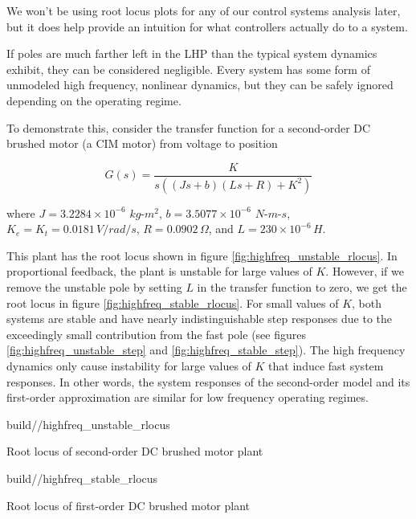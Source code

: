 We won't be using root locus plots for any of our control systems analysis
later, but it does help provide an intuition for what \glspl{controller}
actually do to a \gls{system}.

If poles are much farther left in the LHP than the typical \gls{system} dynamics
exhibit, they can be considered negligible. Every \gls{system} has some form of
unmodeled high frequency, nonlinear dynamics, but they can be safely ignored
depending on the operating regime.

To demonstrate this, consider the transfer function for a second-order DC
brushed motor (a CIM motor) from voltage to position

\begin{equation*}
  G(s) = \frac{K}{s((Js + b)(Ls + R) + K^2)}
\end{equation*}

where $J = 3.2284 \times 10^{-6}$ $kg$-$m^2$, $b = 3.5077 \times 10^{-6}$
$N$-$m$-$s$, $K_e = K_t = 0.0181 \,V/rad/s$, $R = 0.0902 \,\Omega$, and
$L = 230 \times 10^{-6} \,H$.

This \gls{plant} has the root locus shown in figure
\ref{fig:highfreq_unstable_rlocus}. In proportional feedback, the \gls{plant} is
unstable for large values of $K$. However, if we remove the unstable pole by
setting $L$ in the transfer function to zero, we get the root locus in figure
\ref{fig:highfreq_stable_rlocus}. For small values of $K$, both \glspl{system}
are stable and have nearly indistinguishable \glspl{step response} due to the
exceedingly small contribution from the fast pole (see figures
\ref{fig:highfreq_unstable_step} and \ref{fig:highfreq_stable_step}). The high
frequency dynamics only cause instability for large values of $K$ that induce
fast \glspl{system response}. In other words, the \glspl{system response} of the
second-order model and its first-order approximation are similar for low
frequency operating regimes.

\begin{bookfigure}
  \begin{minisvg}{2}{build/\chapterpath/highfreq_unstable_rlocus}
    \caption{Root locus of second-order DC brushed motor plant}
    \label{fig:highfreq_unstable_rlocus}
  \end{minisvg}
  \hfill
  \begin{minisvg}{2}{build/\chapterpath/highfreq_stable_rlocus}
    \caption{Root locus of first-order DC brushed motor plant}
    \label{fig:highfreq_stable_rlocus}
  \end{minisvg}
\end{bookfigure}

